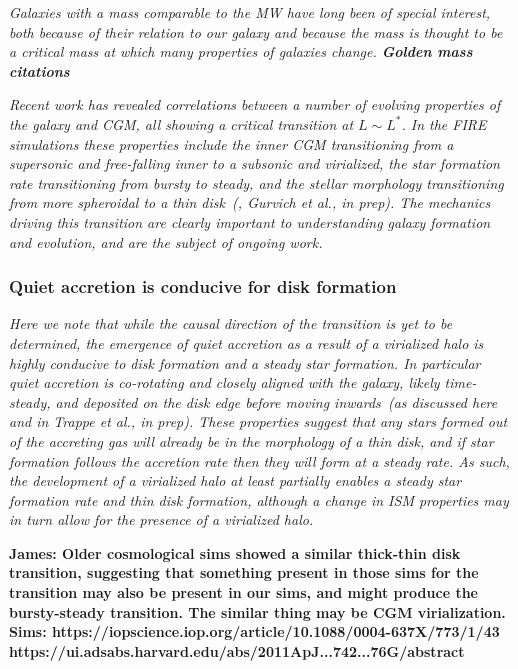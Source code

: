 \documentclass[fleqn,usenatbib]{mnras}
\begin{document}
\textit{
Galaxies with a mass comparable to the MW have long been of special interest, both because of their relation to our galaxy and because the mass is thought to be a critical mass at which many properties of galaxies change.
\textbf{Golden mass citations}
}

\textit{
Recent work has revealed correlations between a number of evolving properties of the galaxy and CGM, all showing a critical transition at $L \sim L^*$.
In the FIRE simulations these properties include the inner CGM transitioning from a supersonic and free-falling inner to a subsonic and virialized, the star formation rate transitioning from bursty to steady, and the stellar morphology transitioning from more spheroidal to a thin disk~(\citealt{Stern2020, Yu2021}, Gurvich et al., in prep).
The mechanics driving this transition are clearly important to understanding galaxy formation and evolution, and are the subject of ongoing work.
}

\subsubsection{Quiet accretion is conducive for disk formation}

\textit{
Here we note that while the causal direction of the transition is yet to be determined, the emergence of quiet accretion as a result of a virialized halo is highly conducive to disk formation and a steady star formation.
In particular quiet accretion is co-rotating and closely aligned with the galaxy, likely time-steady, and deposited on the disk edge before moving inwards~(as discussed here and in Trappe et al., in prep).
These properties suggest that any stars formed out of the accreting gas will already be in the morphology of a thin disk, and if star formation follows the accretion rate then they will form at a steady rate.
As such, the development of a virialized halo at least partially enables a steady star formation rate and thin disk formation, although a change in ISM properties may in turn allow for the presence of a virialized halo.
}

\textbf{
James: Older cosmological sims showed a similar thick-thin disk transition, suggesting that something present in those sims for the transition may also be present in our sims, and might produce the bursty-steady transition.
The similar thing may be CGM virialization.
Sims: 
https://iopscience.iop.org/article/10.1088/0004-637X/773/1/43
https://ui.adsabs.harvard.edu/abs/2011ApJ...742...76G/abstract
}
\end{document}

